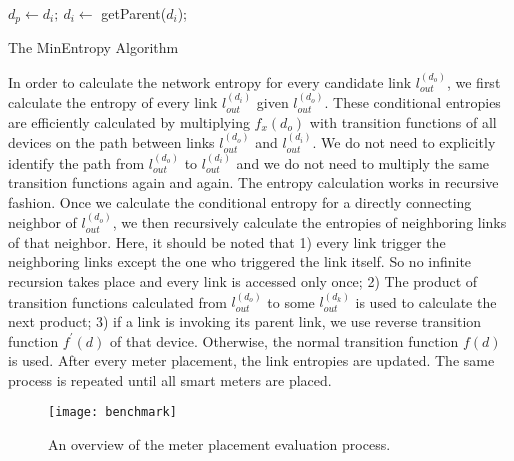 \begin{algorithm}[!htp]
\begin{small}
{   
$d_p \leftarrow d_i;\ d_i \leftarrow$ getParent($d_i$);\\
}
\caption{The MinEntropy Algorithm} \label{algo-2}
\end{small}
\end{algorithm}

In order to calculate the network entropy for every candidate link $l_{out}^{(d_o)}$, we first calculate the entropy of every link $l_{out}^{(d_i)}$ given $l_{out}^{(d_o)}$. These conditional entropies are efficiently calculated by multiplying $f_x(d_o)$ with transition functions of all devices on the path between links $l_{out}^{(d_o)}$ and $l_{out}^{(d_i)}$. We do not need to explicitly identify the path from $l_{out}^{(d_o)}$ to $l_{out}^{(d_i)}$ and we do not need to multiply the same transition functions again and again. The entropy calculation works in recursive fashion. Once we calculate the conditional entropy for a directly connecting neighbor of $l_{out}^{(d_o)}$, we then recursively calculate the entropies of neighboring links of that neighbor. Here, it should be noted that 1) every link trigger the neighboring links except the one who triggered the link itself. So no infinite recursion takes place and every link is accessed only once; 2) The product of transition functions calculated from $l_{out}^{(d_o)}$ to some $l_{out}^{(d_k)}$ is used to calculate the next product; 3) if a link is invoking its parent link, we use reverse transition function $f^\prime(d)$ of that device. Otherwise, the normal transition function $f(d)$ is used. After every meter placement, the link entropies are updated. The same process is repeated until all smart meters are placed.

\begin{figure}[!t]
\centering
\texttt{[image: benchmark]}
\caption{An overview of the meter placement evaluation process. }
\label{fig:benchmark}
\end{figure}

